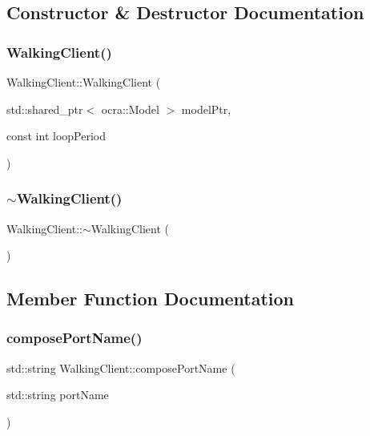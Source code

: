 \subsection{Constructor \& Destructor Documentation}
\hypertarget{classWalkingClient_a6c9002a44a54814c4b482739824e39aa}{}\label{classWalkingClient_a6c9002a44a54814c4b482739824e39aa} 
\subsubsection{\texorpdfstring{Walking\+Client()}{WalkingClient()}}
{\footnotesize\ttfamily Walking\+Client\+::\+Walking\+Client (\begin{DoxyParamCaption}\item[{std\+::shared\+\_\+ptr$<$ ocra\+::\+Model $>$}]{model\+Ptr,  }\item[{const int}]{loop\+Period }\end{DoxyParamCaption})}

\hypertarget{classWalkingClient_a1dbc0308f844aea6542750104fddf8e2}{}\label{classWalkingClient_a1dbc0308f844aea6542750104fddf8e2} 
\subsubsection{\texorpdfstring{$\sim$\+Walking\+Client()}{~WalkingClient()}}
{\footnotesize\ttfamily Walking\+Client\+::$\sim$\+Walking\+Client (\begin{DoxyParamCaption}{ }\end{DoxyParamCaption})\hspace{0.3cm}{\ttfamily [virtual]}}



\subsection{Member Function Documentation}
\hypertarget{classWalkingClient_ae8f7dc629313df7d362e3edd6f45ae10}{}\label{classWalkingClient_ae8f7dc629313df7d362e3edd6f45ae10} 
\subsubsection{\texorpdfstring{compose\+Port\+Name()}{composePortName()}}
{\footnotesize\ttfamily std\+::string Walking\+Client\+::compose\+Port\+Name (\begin{DoxyParamCaption}\item[{std\+::string}]{port\+Name }\end{DoxyParamCaption})}

